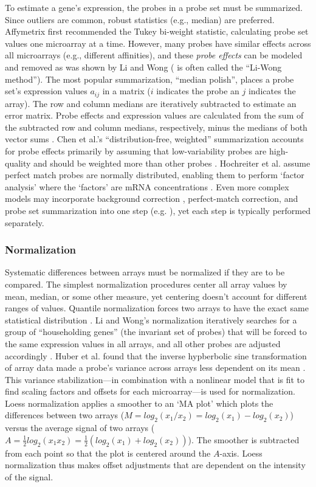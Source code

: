 To estimate a gene's expression, the probes in a probe
set must be summarized. 
Since outliers are common, robust
statistics (e.g., median) are preferred.
Affymetrix first recommended the Tukey bi-weight
statistic, calculating probe set values one microarray at a time.
However, many probes have similar effects across all microarrays
(e.g., different affinities), and these \textit{probe effects} can 
be modeled and removed as was shown by Li and Wong 
(\cite{Li:2001jv,Li:2001wk} is often called the ``Li-Wong method'').
The most popular summarization, ``median polish'', places a probe set's expression
values $a_{ij}$ in a matrix ($i$ indicates the probe an $j$ 
indicates the array). The row and column medians are 
iteratively subtracted to estimate an error matrix. Probe effects and
expression values are calculated from the sum of the subtracted row 
and column medians, respectively, minus the 
medians of both vector sums \cite{Mosteller:1977vp,Irizarry:2003ge}.  
Chen et al.'s ``distribution-free, weighted'' summarization
accounts for probe effects primarily by assuming that low-variability
probes are high-quality and should be weighted more 
than other probes \cite{Chen:2007cr}.
Hochreiter et al. assume perfect match probes are normally distributed, enabling
them to perform `factor analysis' 
where the `factors'
are mRNA concentrations \cite{Hochreiter:2006ja}. 
Even more complex models may incorporate 
background correction , perfect-match correction, and probe set summarization
into one step (e.g. \cite{Zhang:2003to,Liu:2005ey}), 
yet each step is typically performed separately.

\subsubsection{Normalization}

Systematic differences between arrays must be normalized if they
are to be compared. The simplest normalization procedures center
all array values by mean, median, or some other measure, yet centering
doesn't account for different ranges of values.
Quantile normalization forces two arrays to have the exact same
statistical distribution \cite{Bolstad:2003ia}. Li and Wong's normalization
iteratively searches for a group of ``householding genes'' (the invariant 
set of probes) that will be forced to the same expression values in all arrays,
and all other probes are adjusted accordingly \cite{Li:2001wk}.
Huber et al. found that the inverse hypberbolic sine transformation
of array data made a probe's variance across arrays 
less dependent on its mean \cite{Huber:2003bw}.
This variance stabilization---in combination with a nonlinear model that is fit to find
scaling factors and offsets for each microarray---is used for normalization.
Loess normalization applies a smoother to an `MA plot' which plots
the differences between two arrays ($M=log_2(x_1/x_2)=log_2(x_1)-log_2(x_2)$)
versus the average signal of two arrays ($A=\frac{1}{2}log_2(x_1x_2)=\frac{1}{2}(log_2(x_1)+log_2(x_2))$).
The smoother is subtracted from each point so that the plot
is centered around the $A$-axis. Loess normalization thus makes
offset adjustments that are dependent on the intensity of the signal.

